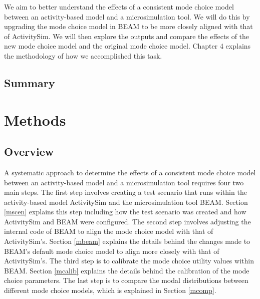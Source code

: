\documentclass[12pt, oneside, openright]{byuthesis}
\begin{document}
We aim to better understand the effects of a consistent mode choice model between an activity-based model and a microsimulation tool. We will do this by upgrading the mode choice model in BEAM to be more closely aligned with that of ActivitySim. We will then explore the outputs and compare the effects of the new mode choice model and the original mode choice model. Chapter 4 explains the methodology of how we accomplished this task.

\hypertarget{summary}{%
\section{Summary}\label{summary}}

\makeatletter
\newenvironment{breakablealgorithm}
  {%
   \begin{center}
     \refstepcounter{algorithm}%
     \hrule height.8pt depth0pt \kern2pt%
     \renewcommand{\caption}[2][\relax]{%
       {\raggedright\textbf{\ALG@name~\thealgorithm} ##2\par}%
       \ifx\relax##1\relax %
         \addcontentsline{loa}{algorithm}{\protect\numberline{\thealgorithm}##2}%
       \else %
         \addcontentsline{loa}{algorithm}{\protect\numberline{\thealgorithm}##1}%
       \fi
       \kern2pt\hrule\kern2pt
     }
  }{%
     \kern2pt\hrule\relax%
   \end{center}
  }
\makeatother

\hypertarget{methods}{%
\chapter{Methods}\label{methods}}

\hypertarget{overview-1}{%
\section{Overview}\label{overview-1}}

A systematic approach to determine the effects of a consistent mode choice model between an activity-based model and a microsimulation tool requires four two main steps. The first step involves creating a test scenario that runs within the activity-based model ActivitySim and the microsimulation tool BEAM. Section \ref{mscen} explains this step including how the test scenario was created and how ActivitySim and BEAM were configured. The second step involves adjusting the internal code of BEAM to align the mode choice model with that of ActivitySim's. Section \ref{mbeam} explains the details behind the changes made to BEAM's default mode choice model to align more closely with that of ActivitySim's. The third step is to calibrate the mode choice utility values within BEAM. Section \ref{mcalib} explains the details behind the calibration of the mode choice parameters. The last step is to compare the modal distributions between different mode choice models, which is explained in Section \ref{mcomp}.
\end{document}
